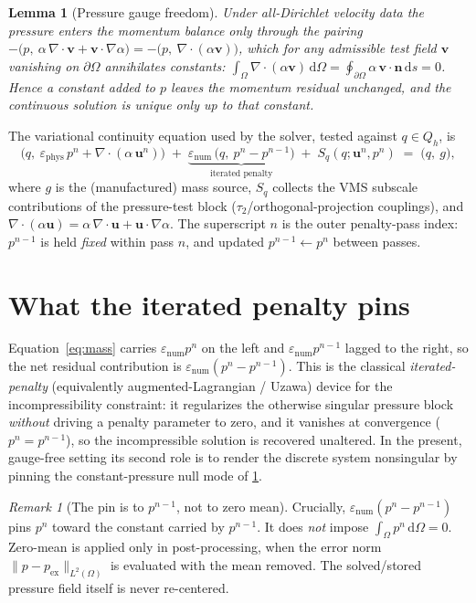 \documentclass[11pt]{article}
\theoremstyle{plain}
\newtheorem{lemma}{Lemma}
\theoremstyle{remark}
\newtheorem{remark}{Remark}
\newcommand{\bu}{\boldsymbol{u}}
\newcommand{\bv}{\boldsymbol{v}}
\newcommand{\bn}{\boldsymbol{n}}
\newcommand{\Om}{\Omega}
\newcommand{\dOm}{\partial\Omega}
\newcommand{\enum}{\varepsilon_{\mathrm{num}}}
\newcommand{\ephys}{\varepsilon_{\mathrm{phys}}}
\newcommand{\norm}[1]{\lVert #1\rVert}
\newcommand{\dx}{\,\mathrm{d}\Omega}
\newcommand{\ds}{\,\mathrm{d}s}
\newcommand{\Ltwo}{L^2(\Omega)}
\begin{document}
\begin{lemma}[Pressure gauge freedom]
\label{lem:gauge}
Under all-Dirichlet velocity data the pressure enters the momentum balance only through the pairing
$-\bigl(p,\ \alpha\,\nabla\!\cdot\bv+\bv\cdot\nabla\alpha\bigr)=-\bigl(p,\ \nabla\!\cdot(\alpha\bv)\bigr)$,
which for any admissible test field $\bv$ vanishing on $\dOm$ annihilates constants:
$\int_{\Om}\nabla\!\cdot(\alpha\bv)\dx=\oint_{\dOm}\alpha\,\bv\cdot\bn\ds=0$. Hence a constant added to
$p$ leaves the momentum residual unchanged, and the continuous solution is unique only up to that
constant.
\end{lemma}

The variational continuity equation used by the solver, tested against $q\in Q_h$, is
\begin{equation}
\label{eq:mass}
\bigl(q,\ \ephys\,p^{n}+\nabla\!\cdot(\alpha\,\bu^{n})\bigr)
\;+\;\underbrace{\enum\,\bigl(q,\ p^{n}-p^{n-1}\bigr)}_{\text{iterated penalty}}
\;+\;S_q(q;\bu^{n},p^{n})
\;=\;\bigl(q,\ g\bigr),
\end{equation}
where $g$ is the (manufactured) mass source, $S_q$ collects the VMS subscale contributions of the
pressure-test block ($\tau_2$/orthogonal-projection couplings), and $\nabla\!\cdot(\alpha\bu)
=\alpha\,\nabla\!\cdot\bu+\bu\cdot\nabla\alpha$. The superscript $n$ is the outer penalty-pass index:
$p^{n-1}$ is held \emph{fixed} within pass $n$, and updated $p^{n-1}\leftarrow p^{n}$ between passes.

\section{What the iterated penalty pins}
\label{sec:penalty}

Equation~\eqref{eq:mass} carries $\enum p^{n}$ on the left and $\enum p^{n-1}$ lagged to the right, so the
net residual contribution is $\enum(p^{n}-p^{n-1})$. This is the classical \emph{iterated-penalty}
(equivalently augmented-Lagrangian / Uzawa) device for the incompressibility constraint: it regularizes
the otherwise singular pressure block \emph{without} driving a penalty parameter to zero, and it
vanishes at convergence ($p^{n}=p^{n-1}$), so the incompressible solution is recovered unaltered. In the
present, gauge-free setting its second role is to render the discrete system nonsingular by pinning the
constant-pressure null mode of \cref{lem:gauge}.

\begin{remark}[The pin is to $p^{n-1}$, not to zero mean]
\label{rem:pin}
Crucially, $\enum(p^{n}-p^{n-1})$ pins $p^{n}$ toward the constant carried by $p^{n-1}$. It does
\emph{not} impose $\int_{\Om}p^{n}\dx=0$. Zero-mean is applied only in post-processing, when the error
norm $\norm{p-p_{\mathrm{ex}}}_{\Ltwo}$ is evaluated with the mean removed. The solved/stored pressure
field itself is never re-centered.
\end{remark}
\end{document}
